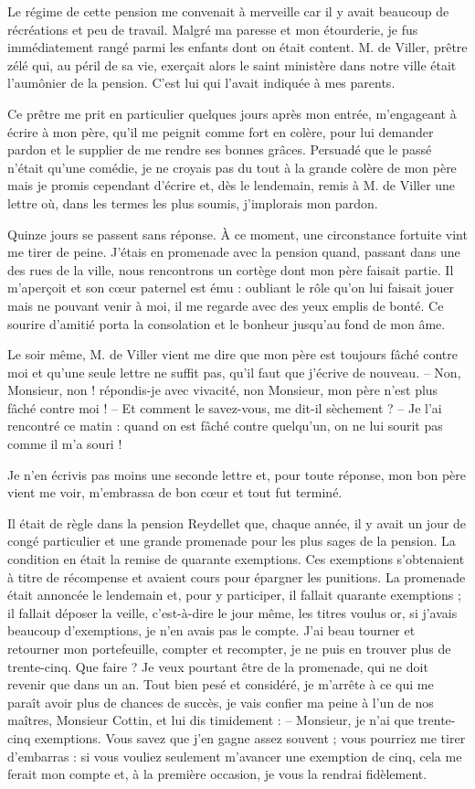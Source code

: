 \documentclass[11pt,a4paper]{report}
\begin{document}
Le régime de cette pension me convenait à merveille car il y avait beaucoup de récréations et peu de travail. Malgré ma paresse et mon étourderie, je fus immédiatement rangé parmi les enfants dont on était content. M. de Viller, prêtre zélé qui, au péril de sa vie, exerçait alors le saint ministère dans notre ville était l'aumônier de la pension. C'est lui qui l'avait indiquée à mes parents.

Ce prêtre me prit en particulier quelques jours après mon entrée, m'engageant à écrire à mon père, qu'il me peignit comme fort en colère, pour lui demander pardon et le supplier de me rendre ses bonnes grâces. Persuadé que le passé n'était qu'une comédie, je ne croyais pas du tout à la grande colère de mon père mais je promis cependant d'écrire et, dès le lendemain, remis à M. de Viller une lettre où, dans les termes les plus soumis, j'implorais mon pardon.

Quinze jours se passent sans réponse. À ce moment, une circonstance fortuite vint me tirer de peine. J'étais en promenade avec la pension quand, passant dans une des rues de la ville, nous rencontrons un cortège dont mon père faisait partie. Il m'aperçoit et son cœur paternel est ému : oubliant le rôle qu'on lui faisait jouer mais ne pouvant venir à moi, il me regarde avec des yeux emplis de bonté. Ce sourire d'amitié porta la consolation et le bonheur jusqu'au fond de mon âme.

Le soir même, M. de Viller vient me dire que mon père est toujours fâché contre moi et qu'une seule lettre ne suffit pas, qu'il faut que j'écrive de nouveau.
-- Non, Monsieur, non ! répondis-je avec vivacité, non Monsieur, mon père n'est plus fâché contre moi !
-- Et comment le savez-vous, me dit-il sèchement ?
-- Je l'ai rencontré ce matin : quand on est fâché contre quelqu'un, on ne lui sourit pas comme il m'a souri !

Je n'en écrivis pas moins une seconde lettre et, pour toute réponse, mon bon père vient me voir, m'embrassa de bon cœur et tout fut terminé.

Il était de règle dans la pension Reydellet que, chaque année, il y avait un jour de congé particulier et une grande promenade pour les plus sages de la pension. La condition en était la remise de quarante exemptions. Ces exemptions s'obtenaient à titre de récompense et avaient cours pour épargner les punitions. La promenade était annoncée le lendemain et, pour y participer, il fallait quarante exemptions ; il fallait déposer la veille, c'est-à-dire le jour même, les titres voulus or, si j'avais beaucoup d'exemptions, je n'en avais pas le compte. J'ai beau tourner et retourner mon portefeuille, compter et recompter, je ne puis en trouver plus de trente-cinq. Que faire ? Je veux pourtant être de la promenade, qui ne doit revenir que dans un an. Tout bien pesé et considéré, je m'arrête à ce qui me paraît avoir plus de chances de succès, je vais confier ma peine à l'un de nos maîtres, Monsieur Cottin, et lui dis timidement :
-- Monsieur, je n'ai que trente-cinq exemptions. Vous savez que j'en gagne assez souvent ; vous pourriez me tirer d'embarras : si vous vouliez seulement m'avancer une exemption de cinq, cela me ferait mon compte et, à la première occasion, je vous la rendrai fidèlement.
\end{document}
